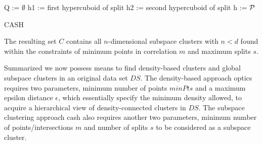 \vspace{5mm}
\begin{algorithm}
\SetAlgoLined
{}
Q := $\emptyset$\;     
h1 := first hypercuboid of split\;
h2 := second hypercuboid of split\;
h := $\mathcal{P}$

 \caption{CASH}
\end{algorithm}
\vspace{5mm}

The resulting set $C$ contains all $n$-dimensional subspace clusters with $n < d$ found within the constraints of minimum points in correlation $m$ and maximum splits $s$.

Summarized we now possess means to find density-based clusters and global subspace clusters in an original data set $DS$. The density-based approach \gls{optics} requires two parameters, minimum number of points $minPts$ and a maximum epsilon distance $\epsilon$, which essentially specify the minimum density allowed, to acquire a hierarchical view of density-connected clusters in $DS$. The subspace clustering approach \gls{cash} also requires another two parameters, minimum number of points/intersections $m$ and number of splits $s$ to be considered as a subspace cluster.

